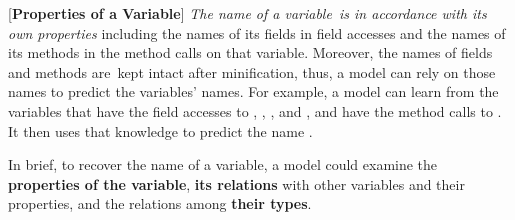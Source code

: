 \vspace{2pt}
 [{\bf Properties of a Variable}] {\em The
  name of a variable~is in accordance with its own properties}
including the names of its fields in field accesses and the names of
its methods in the method calls on that variable. Moreover, the names
of fields and methods are~kept intact after minification, thus, a
model can rely on those names to predict the variables' names. For
example, a model can learn from the variables that have the field
accesses to , ,
, and , and have the method
calls to .  It then uses that knowledge to
predict the name .


In brief, to recover the name of a variable, a model could examine the
{\bf properties of the variable}, {\bf its relations} with other
variables and their properties, and the relations among {\bf their
  types}.















